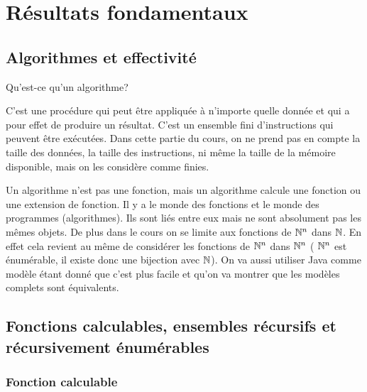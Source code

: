
\chapter{Résultats fondamentaux}
\label{ch:r_sultats_fondamentaux}

\section{Algorithmes et effectivité}
\label{sec:algorithmes_et_effectivit_}
Qu'est-ce qu'un algorithme?

\begin{mydef}[Algorithme]
	C'est une procédure qui peut être appliquée à n'importe
	quelle donnée et qui a pour effet de produire un résultat. C'est un ensemble fini
	d'instructions qui peuvent être exécutées. Dans cette partie du cours, on ne prend pas en compte la taille des données, la taille des instructions, ni même la taille de la mémoire disponible, mais on les considère comme finies.
\end{mydef}

\begin{myrem}
	Un algorithme n'est pas une fonction, mais un algorithme calcule une fonction ou une extension de fonction. Il y a le monde des fonctions et le monde des programmes (algorithmes). Ils sont liés entre eux mais ne sont absolument pas les mêmes objets.
	De plus dans le cours on se limite aux fonctions de $\mathbb{N}^n$ dans $\mathbb{N}$. En effet cela revient au même de considérer les fonctions de $\mathbb{N}^n$ dans $\mathbb{N}^n$ (
	$\mathbb{N}^n$ est énumérable, il existe donc une bijection avec $\mathbb{N}$). On va aussi
	utiliser Java comme modèle étant donné que c'est plus facile et qu'on va montrer
	que les modèles complets sont équivalents.
\end{myrem}


\section{Fonctions calculables, ensembles récursifs et récursivement énumérables}
\label{sec:fonctions_calculables_ensembles_r_crusids_et_r_cursivement_num_rables}

\subsection{Fonction calculable}
\label{sub:fonction_calculable}

